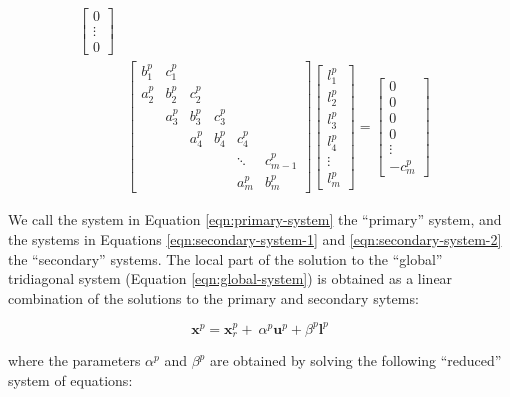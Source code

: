 \documentclass{elsarticle}
\begin{document}
\begin{align}
\begin{bmatrix}
0 \\
\vdots \\
0
\end{bmatrix} & \label{eqn:secondary-system-1} \\
%
%
%
& \begin{bmatrix}
b_1^p & c_1^p \\
a_2^p & b_2^p & c_2^p \\
      & a_3^p & b_3^p & c_3^p \\
      &       & a_4^p & b_4^p & c_4^p \\
      &       &       &       &  \ddots & c_{m-1}^p\\
      &       &       &       &     a_{m}^p  & b_{m}^p
\end{bmatrix}
\begin{bmatrix}
l_1^p \\
l_2^p \\
l_3^p \\
l_4^p \\
\vdots \\
l_m^p
\end{bmatrix}
=
\begin{bmatrix}
0 \\
0 \\
0 \\
0 \\
\vdots \\
-c_m^p
\end{bmatrix} & \label{eqn:secondary-system-2}
\end{align}

We call the system in Equation \ref{eqn:primary-system}
the ``primary'' system, and the systems in
Equations
\ref{eqn:secondary-system-1} and \ref{eqn:secondary-system-2}
the ``secondary'' systems.
The local part of the solution to the ``global'' tridiagonal system
(Equation \ref{eqn:global-system})
is obtained as a linear combination of
the solutions to the primary and secondary sytems:

\begin{equation}
    \boldsymbol{x}^p = \boldsymbol{x}_r^p + \
        \alpha^p \boldsymbol{u}^p + \beta^p \boldsymbol{l}^p
    \label{eqn:sum-of-systems}
\end{equation}

where the  parameters $\alpha^p$ and $\beta^p$ are obtained by
solving the following ``reduced'' system of equations:
\end{document}
